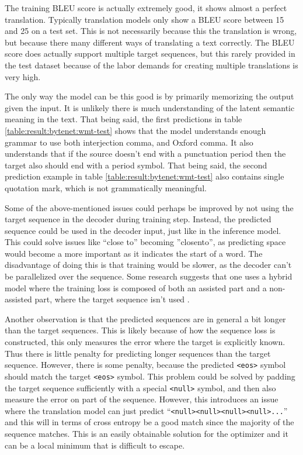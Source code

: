The training BLEU score is actually extremely good, it shows almost a perfect translation. Typically translation models only show a BLEU score between 15 and 25 on a test set. This is not necessarily because this the translation is wrong, but because there many different ways of translating a text correctly. The BLEU score does actually support multiple target sequences, but this rarely provided in the test dataset because of the labor demands for creating multiple translations is very high.

The only way the model can be this good is by primarily memorizing the output given the input. It is unlikely there is much understanding of the latent semantic meaning in the text. That being said, the first predictions in table \ref{table:result:bytenet:wmt-test} shows that the model understands enough grammar to use both interjection comma, and Oxford comma. It also understands that if the source doesn't end with a punctuation period then the target also should end with a period symbol. That being said, the second prediction example in table \ref{table:result:bytenet:wmt-test} also contains single quotation mark, which is not grammatically meaningful. 

Some of the above-mentioned issues could perhaps be improved by not using the target sequence in the decoder during training step. Instead, the predicted sequence could be used in the decoder input, just like in the inference model. This could solve issues like ``close to'' becoming ''closento'', as predicting space would become a more important as it indicates the start of a word. The disadvantage of doing this is that training would be slower, as the decoder can't be parallelized over the sequence. Some research suggests that one uses a hybrid model where the training loss is composed of both an assisted part and a non-assisted part, where the target sequence isn't used \cite{no-assist-train}.

Another observation is that the predicted sequences are in general a bit longer than the target sequences. This is likely because of how the sequence loss is constructed, this only measures the error where the target is explicitly known. Thus there is little penalty for predicting longer sequences than the target sequence. However, there is some penalty, because the predicted \texttt{<eos>} symbol should match the target \texttt{<eos>} symbol. This problem could be solved by padding the target sequence sufficiently with a special \texttt{<null>} symbol, and then also measure the error on part of the sequence. However, this introduces an issue where the translation model can just predict ``\texttt{<null><null><null><null>...}'' and this will in terms of cross entropy be a good match since the majority of the sequence matches. This is an easily obtainable solution for the optimizer and it can be a local minimum that is difficult to escape.

